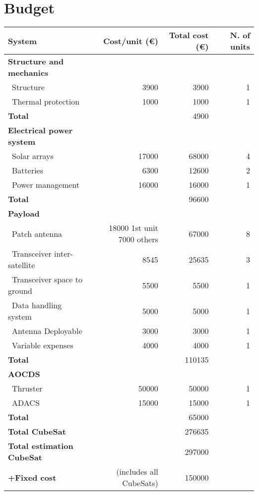\section{Budget}

\begin{longtable}{| l | r | r | r |}
\rowcolor[gray]{0.80}	\textbf{System} & \textbf{Cost/unit (\euro)} & \textbf{Total cost (\euro)} & \textbf{N. of units}\\
    \hline
    \endfirsthead


\rowcolor[gray]{0.85} \textbf{Structure and mechanics} & & & \\
   ~Structure & 3900 & 3900 & 1 \\
   ~Thermal protection & 1000  & 1000 & 1\\
   \hline
   \rowcolor[gray]{0.95} \textbf{Total} &  & 4900 &  \\
   \hline
   
\rowcolor[gray]{0.85} \textbf{Electrical power system} & & & \\
   ~Solar arrays & 17000 & 68000 & 4 \\
   ~Batteries & 6300 & 12600 & 2 \\
   ~Power management & 16000 & 16000 & 1 \\
   \hline
   \rowcolor[gray]{0.95} \textbf{Total} & & 96600 &  \\
   \hline

\rowcolor[gray]{0.85} \textbf{Payload} & & & \\

   ~Patch antenna & \makecell{18000 1st unit \\ 7000 others} & 67000 & 8 \\
   ~Transceiver inter-satellite & 8545 & 25635 & 3 \\
   ~Transceiver space to ground & 5500  & 5500 & 1 \\
   ~Data handling system & 5000 & 5000 & 1\\
   ~Antenna Deployable & 3000 & 3000 & 1\\
   ~Variable expenses & 4000 & 4000 & 1\\
   \hline
   \rowcolor[gray]{0.95} \textbf{Total} & & 110135 & \\
   \hline
   
\rowcolor[gray]{0.85} \textbf{AOCDS} & & &\\

   ~Thruster & 50000 & 50000 & 1 \\
   ~ADACS & 15000 & 15000 & 1 \\
   \hline
   \rowcolor[gray]{0.95} \textbf{Total} & & 65000 & \\
   \hline

\rowcolor[gray]{0.9} \textbf{Total CubeSat} & & 276635 & \\
\hline
\rowcolor[gray]{0.9} \textbf{Total estimation CubeSat} & & 297000 & \\
\hline
\rowcolor[gray]{0.9} \textbf{+Fixed cost} & (includes all CubeSats) & 150000 & \\
\hline

\end{longtable} 

